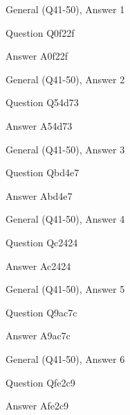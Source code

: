\documentclass[11pt]{beamer}
\begin{document}
\begin{frame}[t]{General (Q41-50), Answer 1}
\vspace{2em}
\begin{block}{Question}
Q0f22f
\end{block}
\pause{}
\begin{block}{Answer}
A0f22f
\end{block}
\end{frame}
    

\begin{frame}[t]{General (Q41-50), Answer 2}
\vspace{2em}
\begin{block}{Question}
Q54d73
\end{block}
\pause{}
\begin{block}{Answer}
A54d73
\end{block}
\end{frame}
    

\begin{frame}[t]{General (Q41-50), Answer 3}
\vspace{2em}
\begin{block}{Question}
Qbd4e7
\end{block}
\pause{}
\begin{block}{Answer}
Abd4e7
\end{block}
\end{frame}
    

\begin{frame}[t]{General (Q41-50), Answer 4}
\vspace{2em}
\begin{block}{Question}
Qc2424
\end{block}
\pause{}
\begin{block}{Answer}
Ac2424
\end{block}
\end{frame}
    

\begin{frame}[t]{General (Q41-50), Answer 5}
\vspace{2em}
\begin{block}{Question}
Q9ac7c
\end{block}
\pause{}
\begin{block}{Answer}
A9ac7c
\end{block}
\end{frame}
    

\begin{frame}[t]{General (Q41-50), Answer 6}
\vspace{2em}
\begin{block}{Question}
Qfe2c9
\end{block}
\pause{}
\begin{block}{Answer}
Afe2c9
\end{block}
\end{frame}
    
\end{document}
